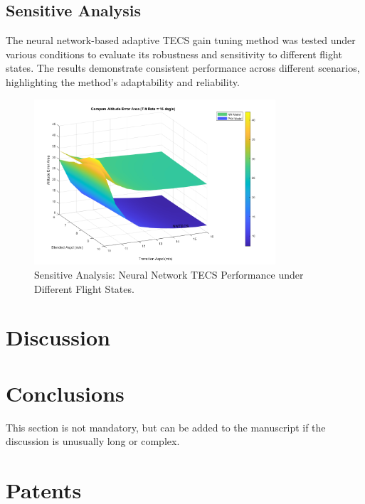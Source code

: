 \documentclass[journal,article,submit,pdftex,moreauthors]{Definitions/mdpi}
\begin{document}
\subsection{Sensitive Analysis}
The neural network-based adaptive TECS gain tuning method was tested under various conditions to evaluate its robustness and sensitivity to different flight states. The results demonstrate consistent performance across different scenarios, highlighting the method's adaptability and reliability.

\begin{figure}[H]
    \centering
    \includegraphics[width=0.8\textwidth]{sensitive_analysis.png}
    \caption{Sensitive Analysis: Neural Network TECS Performance under Different Flight States.}
    \label{fig:sensitive_analysis}
\end{figure}

\section{Discussion}



\section{Conclusions}

This section is not mandatory, but can be added to the manuscript if the discussion is unusually long or complex.

\section{Patents}

\vspace{6pt} 
\end{document}

